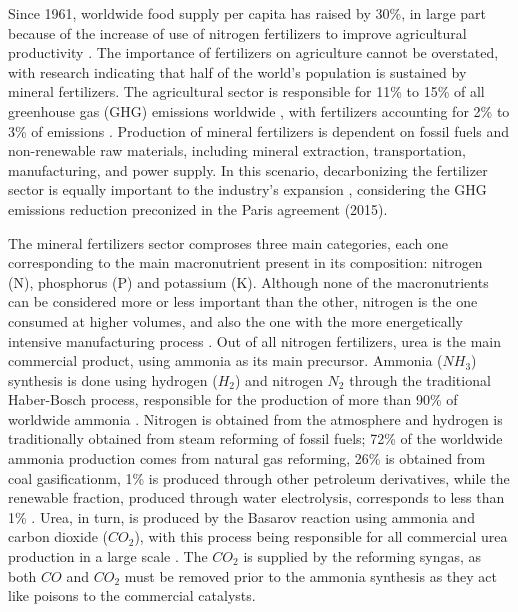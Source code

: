 \documentclass[a4paper, titlepage]{article}
\begin{document}
Since 1961, worldwide food supply per capita has raised by 30\%, in large part because of the increase of use of
nitrogen fertilizers to improve agricultural productivity \cite{mbowIPCCSpecialReport2019}. The importance of
fertilizers on agriculture cannot be overstated, with research indicating that half of the world’s population is
sustained by mineral fertilizers. The agricultural sector is responsible for 11\% to 15\% of all greenhouse gas (GHG)
emissions worldwide \cite{ifaEstimatingReportingFertilizerRelated2016}, with fertilizers accounting for 2\% to 3\% of
emissions \cite{brentrupCarbonFootprintAnalysis2016}. Production of mineral fertilizers is dependent on fossil fuels and
non-renewable raw materials, including mineral extraction, transportation, manufacturing, and power supply. In this
scenario, decarbonizing the fertilizer sector is equally important to the industry’s expansion
\cite{ouikhalfanNetZeroEmissionFertilizers2022}, considering the GHG emissions reduction preconized in the Paris
agreement (2015).

The mineral fertilizers sector comproses three main categories, each one corresponding to the main macronutrient present
in its composition: nitrogen (N), phosphorus (P) and potassium (K). Although none of the macronutrients can be
considered more or less important than the other, nitrogen is the one consumed at higher volumes, and also the one with
the more energetically intensive manufacturing process \cite{ieaAmmoniaTechnologyRoadmap2021}. Out of all nitrogen
fertilizers, urea is the main commercial product, using ammonia as its main precursor. Ammonia ($NH_3$) synthesis is
done using hydrogen ($H_2$) and nitrogen $N_2$ through the traditional Haber-Bosch process, responsible for the
production of more than 90\% of worldwide ammonia \cite{applAmmoniaPrinciplesIndustrial1999}. Nitrogen is obtained from
the atmosphere and hydrogen is traditionally obtained from steam reforming of fossil fuels; 72\% of the worldwide
ammonia production comes from natural gas reforming, 26\% is obtained from coal gasificationm, 1\% is produced through
other petroleum derivatives, while the renewable fraction, produced through water electrolysis, corresponds to less than
1\% \cite{ieaAmmoniaTechnologyRoadmap2021}. Urea, in turn, is produced by the Basarov reaction using ammonia and carbon
dioxide ($CO_2$), with this process being responsible for all commercial urea production in a large scale
\cite{meessenUrea2010}. The $CO_2$ is supplied by the reforming syngas, as both $CO$ and $CO_2$ must be removed prior to
the ammonia synthesis as they act like poisons to the commercial catalysts.
\end{document}
